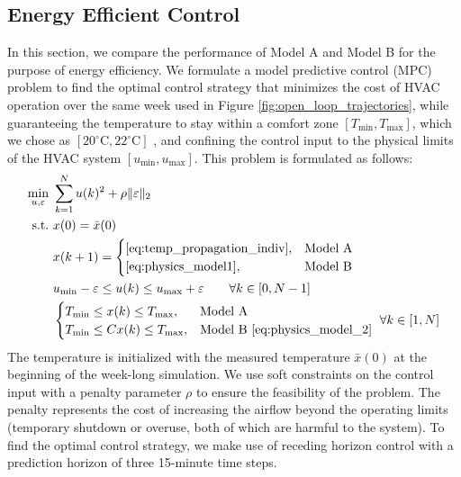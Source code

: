 \subsection{Energy Efficient Control}\label{sec:energy_efficient_control}
In this section, we compare the performance of Model A and Model B for the purpose of energy efficiency. We formulate a model predictive control (MPC) problem to find the optimal control strategy that minimizes the cost of HVAC operation over the same week used in Figure \ref{fig:open_loop_trajectories}, while guaranteeing the temperature to stay within a comfort zone $[T_{\text{min}}, T_{\text{max}}]$, which we chose as $[20^\circ \text{C}, 22^\circ \text{C}]$ \cite{Hansen:2013aa}, and confining the control input to the physical limits of the HVAC system $[u_{\text{min}}, u_{\text{max}}]$. This problem is formulated as follows:
\begin{equation}\label{eq:ee_controller}
\begin{split}
\min_{u, \varepsilon}~&\sum_{k=1}^N u(k)^2 + \rho \Vert\varepsilon\Vert_2 \\
\text{s.t.}~& x(0) = \bar{x}(0) \\
& x(k+1) = \begin{cases}
      \eqref{eq:temp_propagation_indiv}, & \text{Model A}  \\
      \eqref{eq:physics_model1}, & \text{Model B}
    \end{cases} \\
& u_{\text{min}}-\varepsilon \leq u(k) \leq u_{\text{max}}+\varepsilon\qquad \forall k\in[0, N-1]\\
& \begin{cases}
      T_{\text{min}} \leq x(k) \leq T_{\text{max}}, & \text{Model A}  \\
      T_{\text{min}} \leq Cx(k) \leq T_{\text{max}}, & \text{Model B}~\eqref{eq:physics_model_2}
    \end{cases}~ \forall k\in[1, N]
\end{split}
\end{equation}
The temperature is initialized with the measured temperature $\bar{x}(0)$ at the beginning of the week-long simulation. We use soft constraints on the control input with a penalty parameter $\rho$ to ensure the feasibility of the problem. The penalty represents the cost of increasing the airflow beyond the operating limits (temporary shutdown or overuse, both of which are harmful to the system). 
To find the optimal control strategy, we make use of receding horizon control with a prediction horizon of three 15-minute time steps.


